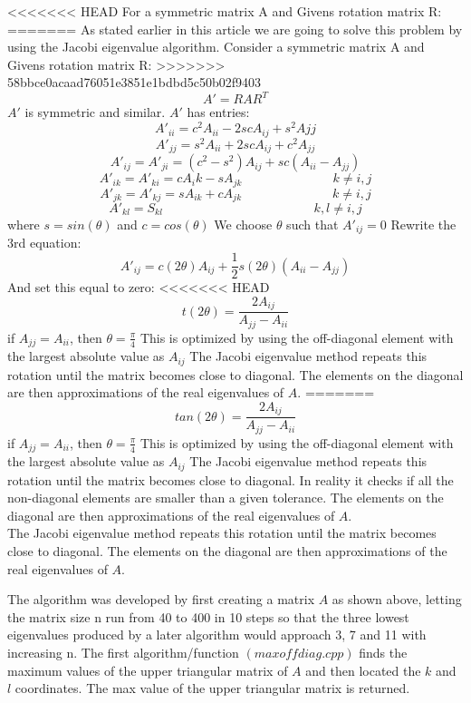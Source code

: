 \documentclass[10pt,a4paper]{article}
\begin{document}
<<<<<<< HEAD
\noindent For a symmetric matrix A and Givens rotation matrix R:
=======
\noindent As stated earlier in this article we are going to solve this problem by using the Jacobi eigenvalue algorithm. Consider a symmetric matrix A and Givens rotation matrix R:
>>>>>>> 58bbce0acaad76051e3851e1bdbd5c50b02f9403
$$A'=RAR^T$$
$A'$ is symmetric and similar. $A'$ has entries:
$$A'_{ii} = c^2A_{ii}-2scA_{ij}+s^2A{jj}$$
$$A'_{jj} = s^2A_{ii}+2scA_{ij}+c^2A_{jj}$$
$$A'_{ij} = A'_{ji} = (c^2-s^2)A_{ij}+sc(A_{ii}-A_{jj})$$
$$A'_{ik}=A'_{ki}=cA_ik-sA_{jk} \hspace{3cm} k\neq i,j$$
$$A'_{jk} = A'_{kj} = sA_{ik}+cA_{jk} \hspace{3cm} k\neq i,j$$
$$A'_{kl} = S_{kl} \hspace{5cm} k,l \neq i,j$$
where $s=sin(\theta)$ and $c=cos(\theta)$
We choose $\theta$ such that $A'_{ij}=0$
Rewrite the 3rd equation:
$$A'_{ij}=c(2\theta)A_{ij}+\frac{1}{2}s(2\theta)(A_{ii}-A_{jj})$$
And set this equal to zero:
<<<<<<< HEAD
$$t(2\theta)=\frac{2A_{ij}}{A_{jj}-A_{ii}}$$
if $A_{jj}=A_{ii}$, then $\theta=\frac{\pi}{4}$
This is optimized by using the off-diagonal element with the largest absolute value as $A_{ij}$
The Jacobi eigenvalue method repeats this rotation until the matrix becomes close to diagonal. The elements on the diagonal are then approximations of the real eigenvalues of $A$.
=======
$$tan(2\theta)=\frac{2A_{ij}}{A_{jj}-A_{ii}}$$
if $A_{jj}=A_{ii}$, then $\theta=\frac{\pi}{4}$
This is optimized by using the off-diagonal element with the largest absolute value as $A_{ij}$
The Jacobi eigenvalue method repeats this rotation until the matrix becomes close to diagonal. In reality it checks if all the non-diagonal elements are smaller than a given tolerance. The elements on the diagonal are then approximations of the real eigenvalues of $A$.\\


\noindent The Jacobi eigenvalue method repeats this rotation until the matrix becomes close to diagonal. The elements on the diagonal are then approximations of the real eigenvalues of $A$.


\noindent The algorithm was developed by first creating a matrix $A$ as shown above, letting the matrix size n run from 40 to 400 in 10 steps so that the three lowest eigenvalues produced by a later algorithm would approach 3, 7 and 11 with increasing n.
The first algorithm/function $(maxoffdiag.cpp)$ finds the maximum values of the upper triangular matrix of $A$ and then located the $k$ and $l$ coordinates. The max value of the upper triangular matrix is returned.
\end{document}
